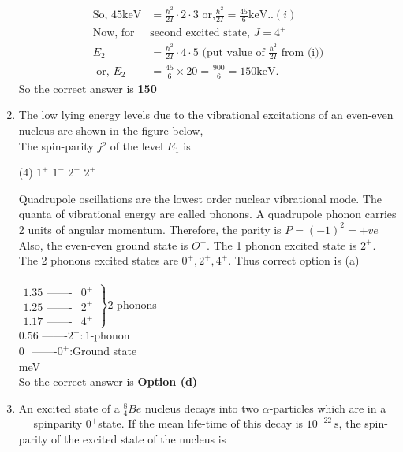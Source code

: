 \begin{enumerate}
\begin{answer}
\begin{align*}
		\text{So, }45 \mathrm{keV}&=\frac{\hbar^2}{2 I} \cdot 2 \cdot 3\text{ or,} \frac{\hbar^2}{2 I}=\frac{45}{6} \mathrm{keV}..(i)\\
		\text{Now, for }&\text{second excited state, }J=4^{+}\\
		E_2&=\frac{\hbar^2}{2 I} \cdot 4 \cdot 5\text{ (put value of $\frac{\hbar^2}{2 I}$ from (i))}\\
		\text{	or, }E_2&=\frac{45}{6} \times 20=\frac{900}{6}=150 \mathrm{keV}.
		\end{align*}
		So the correct answer is \textbf{150}
	\end{answer}
	\item  The low lying energy levels due to the vibrational excitations of an even-even nucleus are shown in the figure below,\\
	The spin-parity $j^p$ of the level $E_1$ is
	{}
	\begin{tasks}(4)
		\task[\textbf{a.}]$1^{+}$
		\task[\textbf{b.}]$1^{-}$
		\task[\textbf{c.}]$2^{-}$
		\task[\textbf{d.}]$2^{+}$ 
	\end{tasks}
	\begin{answer}
		Quadrupole oscillations are the lowest order nuclear vibrational mode. The quanta of vibrational energy are called phonons. A quadrupole phonon carries 2 units of angular momentum. Therefore, the parity is $P=(-1)^2=+v e$\\
		Also, the even-even ground state is $O^{+}$. The 1 phonon excited state is $2^{+}$. The 2 phonons excited states are $0^{+}, 2^{+}, 4^{+}$. Thus correct option is (a)\\\\
		$\left.\begin{array}{ll}1.35\text{ -------}& 0^{+} \\ 1.25 \text{ -------}& 2^{+} \\ 1.17 \text{ -------}& 4^{+}\end{array}\right\} 2$-phonons\\
		$0.56\text{ -------}2^{+}: 1$-phonon\\
		0 $\text{ -------}0^{+}$:Ground state\\
		meV\\
		So the correct answer is \textbf{Option (d)}
	\end{answer}
	\item  An excited state of a ${ }_4^8 B e$ nucleus decays into two $\alpha$-particles which are in a $\quad$ spinparity $0^{+}$state. If the mean life-time of this decay is $10^{-22} \mathrm{~s}$, the spin-parity of the excited state of the nucleus is

\end{enumerate}

